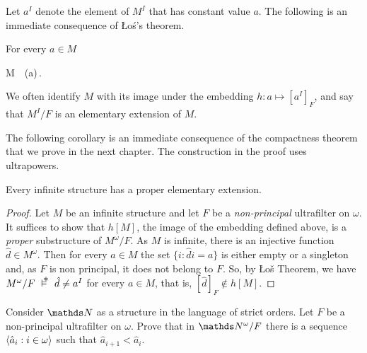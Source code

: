 \documentclass[creche.tex]{subfiles}
\begin{document}
Let \emph{$a^I$\/} denote the element of $M^I$ that has constant value $a$. The following is an immediate consequence of \L o\'{s}'s theorem.

\begin{corollary}\label{ultrapotenzeelementari}
For every $a\in M$

%
{\IFF}%
{M\ \models\ \phi(a)\,.}\QED
\end{corollary}


We often identify $M$ with its image under the embedding $h:a\mapsto [a^I]_F$, and say that $M^I/F$ is an elementary extension of $M$.

The following corollary is an immediate consequence of the compactness theorem that we prove in the next chapter. The construction in the proof uses ultrapowers.

\begin{corollary}
Every infinite structure has a proper elementary extension.
\end{corollary}

\begin{proof}
Let $M$ be an infinite structure and let $F$ be a \textit{non-principal\/} ultrafilter on $\omega$. It suffices to show that $h[M]$, the image of the embedding defined above, is a \textit{proper\/} substructure of $M^\omega/F$.  As $M$ is infinite, there is an injective function  $\hat d\in M^\omega$. Then for every $a\in M$ the set $\big\{i:\hat di=a\big\}$ is either empty or a singleton and, as $F$ is non principal, it does not belong to $F$. So, by \L o\v{s} Theorem, we have $M^\omega/F\ \pmodels\ \hat d\neq a^I$ for every $a\in M$, that is, $[\hat d]_F\notin h[M]$.
\end{proof}


\begin{exercise}
Consider $\NN$ as a structure in the language of strict orders.  Let $F$ be a non-principal ultrafilter on $\omega$. Prove that in $\NN^\omega/F$ there is a sequence $\langle\hat a_i: i\in\omega\rangle$ such that $\hat a_{i+1}<\hat a_i$.\QED 
\end{exercise}
\end{document}
